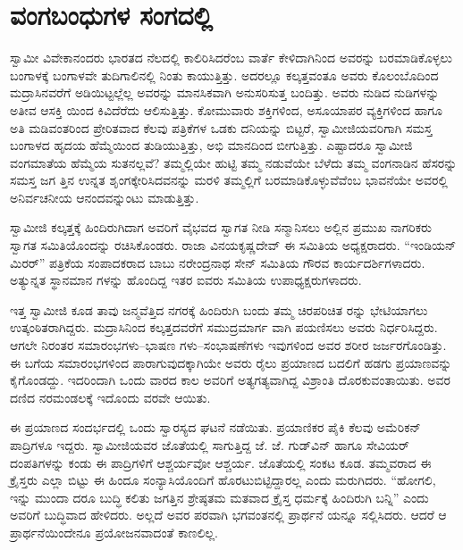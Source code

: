 
\chapter{ವಂಗಬಂಧುಗಳ ಸಂಗದಲ್ಲಿ}

\noindent

ಸ್ವಾಮೀ ವಿವೇಕಾನಂದರು ಭಾರತದ ನೆಲದಲ್ಲಿ ಕಾಲಿರಿಸಿದರೆಂಬ ವಾರ್ತೆ ಕೇಳಿದಾಗಿನಿಂದ ಅವರನ್ನು ಬರಮಾಡಿಕೊಳ್ಳಲು ಬಂಗಾಳಕ್ಕೆ ಬಂಗಾಳವೇ ತುದಿಗಾಲಿನಲ್ಲಿ ನಿಂತು ಕಾಯುತ್ತಿತ್ತು. ಅದರಲ್ಲೂ ಕಲ್ಕತ್ತವಂತೂ ಅವರು ಕೊಲಂಬೊದಿಂದ ಮದ್ರಾಸಿನವರೆಗೆ ಅಡಿಯಿಟ್ಟಲ್ಲೆಲ್ಲ ಅವರನ್ನು ಮಾನಸಿಕವಾಗಿ ಅನುಸರಿಸುತ್ತ ಬಂದಿತ್ತು. ಅವರು ನುಡಿದ ನುಡಿಗಳನ್ನು ಅತೀವ ಆಸಕ್ತಿ ಯಿಂದ ಕಿವಿದೆರೆದು ಆಲಿಸುತ್ತಿತ್ತು. ಕೋಮುವಾರು ಶಕ್ತಿಗಳಿಂದ, ಅಸೂಯಾಪರ ವ್ಯಕ್ತಿಗಳಿಂದ ಹಾಗೂ ಅತಿ ಮಡಿವಂತರಿಂದ ಪ್ರೇರಿತವಾದ ಕೆಲವು ಪತ್ರಿಕೆಗಳ ಒಡಕು ದನಿಯನ್ನು ಬಿಟ್ಟರೆ, ಸ್ವಾಮೀಜಿಯವರಿಗಾಗಿ ಸಮಸ್ತ ಬಂಗಾಳದ ಹೃದಯ ಹೆಮ್ಮೆಯಿಂದ ತುಡಿಯುತ್ತಿತ್ತು, ಅಭಿ ಮಾನದಿಂದ ಬೀಗುತ್ತಿತ್ತು. ಎಷ್ಟಾದರೂ ಸ್ವಾಮೀಜಿ ವಂಗಮಾತೆಯ ಹೆಮ್ಮೆಯ ಸುತನಲ್ಲವೆ? ತಮ್ಮಲ್ಲಿಯೇ ಹುಟ್ಟಿ ತಮ್ಮ ನಡುವೆಯೇ ಬೆಳೆದು ತಮ್ಮ ವಂಗನಾಡಿನ ಹೆಸರನ್ನು ಸಮಸ್ತ ಜಗ ತ್ತಿನ ಉನ್ನತ ಶೃಂಗಕ್ಕೇರಿಸಿದವನನ್ನು ಮರಳಿ ತಮ್ಮಲ್ಲಿಗೆ ಬರಮಾಡಿಕೊಳ್ಳುವೆವೆಂಬ ಭಾವನೆಯೇ ಅವರಲ್ಲಿ ಅನಿರ್ವಚನೀಯ ಆನಂದವನ್ನುಂಟು ಮಾಡುತ್ತಿತ್ತು.

ಸ್ವಾಮೀಜಿ ಕಲ್ಕತ್ತಕ್ಕೆ ಹಿಂದಿರುಗಿದಾಗ ಅವರಿಗೆ ವೈಭವದ ಸ್ವಾಗತ ನೀಡಿ ಸನ್ಮಾನಿಸಲು ಅಲ್ಲಿನ ಪ್ರಮುಖ ನಾಗರಿಕರು ಸ್ವಾಗತ ಸಮಿತಿಯೊಂದನ್ನು ರಚಿಸಿಕೊಂಡರು. ರಾಜಾ ವಿನಯಕೃಷ್ಣದೇವ್ ಈ ಸಮಿತಿಯ ಅಧ್ಯಕ್ಷರಾದರು. “ಇಂಡಿಯನ್ ಮಿರರ್​” ಪತ್ರಿಕೆಯ ಸಂಪಾದಕರಾದ ಬಾಬು ನರೇಂದ್ರನಾಥ ಸೇನ್ ಸಮಿತಿಯ ಗೌರವ ಕಾರ್ಯದರ್ಶಿಗಳಾದರು. ಅತ್ಯುನ್ನತ ಸ್ಥಾನಮಾನ ಗಳನ್ನು ಹೊಂದಿದ್ದ ಇತರ ಐವರು ಸಮಿತಿಯ ಉಪಾಧ್ಯಕ್ಷರುಗಳಾದರು.

ಇತ್ತ ಸ್ವಾಮೀಜಿ ಕೂಡ ತಾವು ಜನ್ಮವೆತ್ತಿದ ನಗರಕ್ಕೆ ಹಿಂದಿರುಗಿ ಬಂದು ತಮ್ಮ ಚಿರಪರಿಚಿತ ರನ್ನು ಭೇಟಿಯಾಗಲು ಉತ್ಕಂಠಿತರಾಗಿದ್ದರು. ಮದ್ರಾಸಿನಿಂದ ಕಲ್ಕತ್ತದವರೆಗೆ ಸಮುದ್ರಮಾರ್ಗ ವಾಗಿ ಪಯಣಿಸಲು ಅವರು ನಿರ್ಧರಿಸಿದ್ದರು. ಆಗಲೇ ನಿರಂತರ ಸಮಾರಂಭಗಳು–ಭಾಷಣ ಗಳು–ಸಂಭಾಷಣೆಗಳು ಇವುಗಳಿಂದ ಅವರ ಶರೀರ ಜರ್ಜರಗೊಂಡಿತ್ತು. ಈ ಬಗೆಯ ಸಮಾರಂಭಗಳಿಂದ ಪಾರಾಗುವುದಕ್ಕಾಗಿಯೇ ಅವರು ರೈಲು ಪ್ರಯಾಣದ ಬದಲಿಗೆ ಹಡಗು ಪ್ರಯಾಣವನ್ನು ಕೈಗೊಂಡದ್ದು. ಇದರಿಂದಾಗಿ ಒಂದು ವಾರದ ಕಾಲ ಅವರಿಗೆ ಅತ್ಯಗತ್ಯವಾಗಿದ್ದ ವಿಶ್ರಾಂತಿ ದೊರಕುವಂತಾಯಿತು. ಅವರ ದಣಿದ ನರಮಂಡಲಕ್ಕೆ ಇದೊಂದು ವರವೇ ಆಯಿತು.

ಈ ಪ್ರಯಾಣದ ಸಂದರ್ಭದಲ್ಲಿ ಒಂದು ಸ್ವಾರಸ್ಯದ ಘಟನೆ ನಡೆಯಿತು. ಪ್ರಯಾಣಿಕರ ಪೈಕಿ ಕೆಲವು ಅಮೆರಿಕನ್ ಪಾದ್ರಿಗಳೂ ಇದ್ದರು. ಸ್ವಾಮೀಜಿಯವರ ಜೊತೆಯಲ್ಲಿ ಸಾಗುತ್ತಿದ್ದ ಜೆ. ಜೆ. ಗುಡ್​ವಿನ್ ಹಾಗೂ ಸೇವಿಯರ್ ದಂಪತಿಗಳನ್ನು ಕಂಡು ಈ ಪಾದ್ರಿಗಳಿಗೆ ಆಶ್ಚರ್ಯವೋ ಆಶ್ಚರ್ಯ. ಜೊತೆಯಲ್ಲಿ ಸಂಕಟ ಕೂಡ. ತಮ್ಮವರಾದ ಈ ಕ್ರೈಸ್ತರು ಎಲ್ಲಾ ಬಿಟ್ಟು ಈ ಹಿಂದೂ ಸಂನ್ಯಾಸಿಯೊಂದಿಗೆ ಹೊರಟುಬಿಟ್ಟಿದ್ದಾರಲ್ಲ ಎಂದು ಮರುಗಿದರು. “ಹೋಗಲಿ, ಇನ್ನು ಮುಂದಾ ದರೂ ಬುದ್ಧಿ ಕಲಿತು ಜಗತ್ತಿನ ಶ್ರೇಷ್ಠತಮ ಮತವಾದ ಕ್ರೈಸ್ತ ಧರ್ಮಕ್ಕೆ ಹಿಂದಿರುಗಿ ಬನ್ನಿ” ಎಂದು ಅವರಿಗೆ ಬುದ್ಧಿವಾದ ಹೇಳಿದರು. ಅಲ್ಲದೆ ಅವರ ಪರವಾಗಿ ಭಗವಂತನಲ್ಲಿ ಪ್ರಾರ್ಥನೆ ಯನ್ನೂ ಸಲ್ಲಿಸಿದರು. ಆದರೆ ಆ ಪ್ರಾರ್ಥನೆಯಿಂದೇನೂ ಪ್ರಯೋಜನವಾದಂತೆ ಕಾಣಲಿಲ್ಲ.

